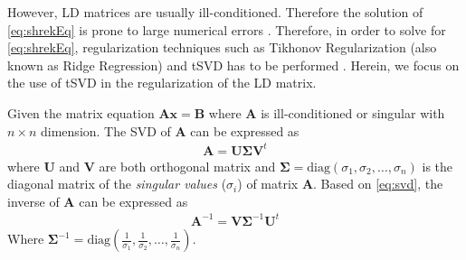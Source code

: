 			However, \gls{LD} matrices are usually ill-conditioned.
			Therefore the solution of \cref{eq:shrekEq} is prone to large numerical errors \citep{Neumaier1998}.
			Therefore, in order to solve for \cref{eq:shrekEq}, regularization techniques such as Tikhonov Regularization (also known as Ridge Regression) and \gls{tSVD} has to be performed \citep{Neumaier1998}. 
			Herein, we focus on the use of \gls{tSVD} in the regularization of the \gls{LD} matrix.
			
			Given the matrix equation $\boldsymbol{Ax}=\boldsymbol{B}$ where $\boldsymbol{A}$ is ill-conditioned or singular with $n\times n$ dimension.
			The \gls{SVD} of $\boldsymbol{A}$ can be expressed as 				
			\begin{align}
				\boldsymbol{A} = \boldsymbol{U\Sigma V}^t
				\label{eq:svd}
			\end{align}
			where $\boldsymbol{U}$ and $\boldsymbol{V}$ are both orthogonal matrix and $\boldsymbol{\Sigma}=\mathrm{diag}(\sigma_1,\sigma_2,\dots,\sigma_n)$ is the diagonal matrix of the \emph{singular values} ($\sigma_i$) of matrix $\boldsymbol{A}$.
			Based on \cref{eq:svd}, the inverse of $\boldsymbol{A}$ can be expressed as
			\begin{align}
				\boldsymbol{A}^{-1}= \boldsymbol{V\Sigma}^{-1}\boldsymbol{U}^t
				\label{eq:svdInverse}
			\end{align}
			Where $
			\boldsymbol{\Sigma}^{-1} = \mathrm{diag}(\frac{1}{\sigma_1},\frac{1}{\sigma_2},\dots,\frac{1}{\sigma_n})$.
			

